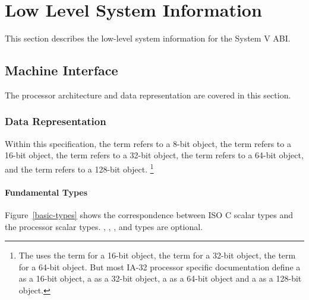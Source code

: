 \chapter{Low Level System Information}

This section describes the low-level system information for the
\xARCH System V ABI.

\section{Machine Interface}

The \xARCH processor architecture and data representation are covered in
this section.

\subsection{Data Representation}

Within this specification, the term \emph{\textindex{\byte{}}} refers to
a 8-bit object, the term \emph{\textindex{\twobyte{}}} refers to a 16-bit
object, the term \emph{\textindex{\fourbyte{}}} refers to a 32-bit
object, the term \emph{\textindex{\eightbyte{}}} refers to a 64-bit
object, and the term \emph{\textindex{\sixteenbyte{}}} refers to a
128-bit object.%
\footnote{The \intelabi uses the term \emph{} for
  a 16-bit object, the term \emph{} for a 32-bit
  object, the term \emph{} for a 64-bit object.  But
  most IA-32 processor specific documentation define a
  \emph{} as a 16-bit object, a
  \emph{} as a 32-bit object, a
  \emph{} as a 64-bit object and a
  \emph{} as a 128-bit object.}

\subsubsection{Fundamental Types}

Figure~\ref{basic-types} shows the correspondence between ISO C
scalar types and the processor scalar types.  ,
, ,  and  types
are optional.

